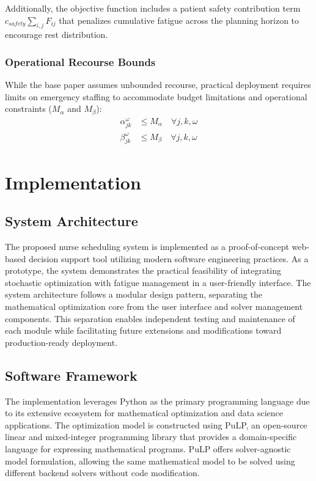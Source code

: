 \documentclass[10pt,a4paper,twocolumn]{article}
\begin{document}
Additionally, the objective function includes a patient safety contribution term $c_{safety} \sum_{i,j} F_{ij}$ that penalizes cumulative fatigue across the planning horizon to encourage rest distribution.

\subsubsection{Operational Recourse Bounds} 
While the base paper assumes unbounded recourse, practical deployment requires limits on emergency staffing to accommodate budget limitations and operational constraints ($M_{\alpha}$ and $M_{\beta}$):
\begin{align}
\alpha_{jk}^{\omega} &\leq M_{\alpha} \quad \forall j, k, \omega \\
\beta_{jk}^{\omega} &\leq M_{\beta} \quad \forall j, k, \omega
\end{align}

\section{Implementation}

\subsection{System Architecture}

The proposed nurse scheduling system is implemented as a proof-of-concept web-based decision support tool utilizing modern software engineering practices. As a prototype, the system demonstrates the practical feasibility of integrating stochastic optimization with fatigue management in a user-friendly interface. The system architecture follows a modular design pattern, separating the mathematical optimization core from the user interface and solver management components. This separation enables independent testing and maintenance of each module while facilitating future extensions and modifications toward production-ready deployment.

\subsection{Software Framework}

The implementation leverages Python as the primary programming language due to its extensive ecosystem for mathematical optimization and data science applications. The optimization model is constructed using PuLP, an open-source linear and mixed-integer programming library that provides a domain-specific language for expressing mathematical programs. PuLP offers solver-agnostic model formulation, allowing the same mathematical model to be solved using different backend solvers without code modification.
\end{document}
